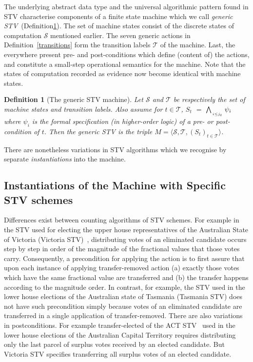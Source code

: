 \documentclass[10pt,conference]{IEEEtran}
\newtheorem{definition}{Definition}
\begin{document}
The underlying abstract data type and the universal algorithmic
pattern found in STV characterise components of a finite state
machine which we call \emph{generic
STV}~(Definition\ref{STVMachine}). The set of machine states consist
of the discrete states of computation $\mathcal{S}$ mentioned
earlier. The seven generic actions in
Definition~\ref{transitions} form the transition labels
$\mathcal{T}$ of the machine. Last, the everywhere present pre- and
post-conditions which define (content of)  the actions, and
constitute a small-step operational semantics for the machine.  
Note that the states of computation recorded as evidence now become identical with machine states.


\begin{definition}[The generic STV machine]\label{STVMachine}
Let $\mathcal{S}$  and $\mathcal{T}$
be respectively the set of machine states and transition labels.  Also assume for $t\in\mathcal{T}$, $S_{t}$ $=$ $\bigwedge_{\atop{i\leq j_{t}}} \psi_{i}$ 
 where $\psi_{i}$ is the formal specification (in higher-order logic) of a pre- or post-condition of $t$. Then the \emph{generic STV} is the triple $M = \langle \mathcal{S}, \mathcal{T}, (S_t)_{t \in \mathcal{T}} \rangle$.  
\end{definition}
There are nonetheless variations in STV algorithms  which we  recognise  by separate \emph{instantiations} into the machine.  
\subsection{Instantiations of the Machine with Specific STV schemes}
Differences exist between counting algorithms of STV schemes.  For
example in the STV used for electing the upper house representatives
of the Australian State of Victoria (Victoria STV)~\cite{vic},
distributing votes of an eliminated candidate occurs step by step in
order of the magnitude of the fractional values that those votes
carry.  Consequently, a precondition for applying the action is to
first assure that upon each instance of applying transfer-removed
action (a) exactly those votes which have the same fractional value
are transferred and (b) the transfer happens according to the
magnitude order. In contrast, for example, the STV used in the lower
house elections of the Australian state of Tasmania (Tasmania STV)
does not have such precondition simply because votes of an
eliminated candidate are transferred in a single application of
transfer-removed. There are also variations in postconditions. For
example transfer-elected of the ACT STV~\cite{act} used in the lower
house elections of the Australian Capital Territory requires distributing only the last parcel of surplus votes received by an elected candidate. But Victoria STV specifies transferring all surplus votes of an elected candidate.  
\end{document}
